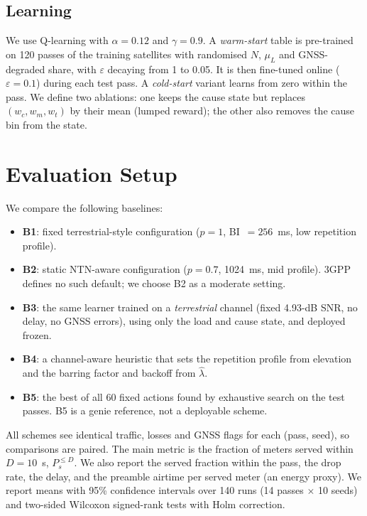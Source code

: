 \documentclass[conference]{IEEEtran}
\begin{document}
\subsection{Learning}
We use Q-learning with $\alpha=0.12$ and $\gamma=0.9$. A \emph{warm-start} table is pre-trained on 120 passes of the training satellites with randomised $N$, $\mu_L$ and GNSS-degraded share, with $\varepsilon$ decaying from 1 to 0.05. It is then fine-tuned online ($\varepsilon=0.1$) during each test pass. A \emph{cold-start} variant learns from zero within the pass. We define two ablations: one keeps the cause state but replaces $(w_c,w_m,w_t)$ by their mean (lumped reward); the other also removes the cause bin from the state.

\section{Evaluation Setup}
We compare the following baselines:
\begin{itemize}
\item \textbf{B1}: fixed terrestrial-style configuration ($p=1$, BI~$=256$~ms, low repetition profile).
\item \textbf{B2}: static NTN-aware configuration ($p=0.7$, 1024~ms, mid profile). 3GPP defines no such default; we choose B2 as a moderate setting.
\item \textbf{B3}: the same learner trained on a \emph{terrestrial} channel (fixed 4.93-dB SNR, no delay, no GNSS errors), using only the load and cause state, and deployed frozen.
\item \textbf{B4}: a channel-aware heuristic that sets the repetition profile from elevation and the barring factor and backoff from $\hat\lambda$.
\item \textbf{B5}: the best of all 60 fixed actions found by exhaustive search on the test passes. B5 is a genie reference, not a deployable scheme.
\end{itemize}
All schemes see identical traffic, losses and GNSS flags for each (pass, seed), so comparisons are paired. The main metric is the fraction of meters served within $D=10$~s, $P_s^{\le D}$. We also report the served fraction within the pass, the drop rate, the delay, and the preamble airtime per served meter (an energy proxy). We report means with 95\% confidence intervals over 140 runs (14 passes $\times$ 10 seeds) and two-sided Wilcoxon signed-rank tests with Holm correction.
\end{document}
